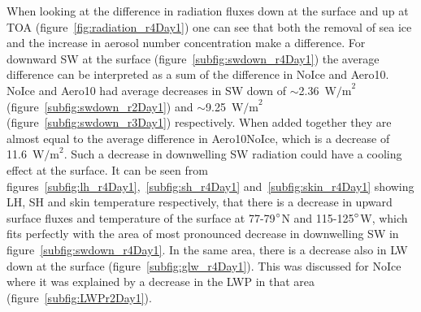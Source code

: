 When looking at the difference in radiation fluxes down at the surface and up at TOA (figure~\ref{fig:radiation_r4Day1}) one can see that both the removal of sea ice and the increase in aerosol number concentration make a difference.  For downward SW at the surface (figure~\ref{subfig:swdown_r4Day1}) the average difference can be interpreted as a sum of the difference in NoIce and Aero10. NoIce and Aero10 had average decreases in SW down of $\sim$2.36~$\text{W/m}^2$ (figure~\ref{subfig:swdown_r2Day1}) and $\sim$9.25~$\text{W/m}^2$ (figure~\ref{subfig:swdown_r3Day1}) respectively. When added together they are almost equal to the average difference in Aero10NoIce, which is a decrease of 11.6~$\text{W/m}^2$. Such a decrease in downwelling SW radiation could have a cooling effect at the surface. It can be seen from figures~\ref{subfig:lh_r4Day1},~\ref{subfig:sh_r4Day1} and~\ref{subfig:skin_r4Day1} showing LH, SH and skin temperature respectively, that there is a decrease in upward surface fluxes and temperature of the surface at 77-79$\degree$N and 115-125$\degree$W, which fits perfectly with the area of most pronounced decrease in downwelling SW in figure~\ref{subfig:swdown_r4Day1}. In the same area, there is a decrease also in LW down at the surface (figure~\ref{subfig:glw_r4Day1}). This was discussed for NoIce where it was explained by a decrease in the LWP in that area (figure~\ref{subfig:LWPr2Day1}).

